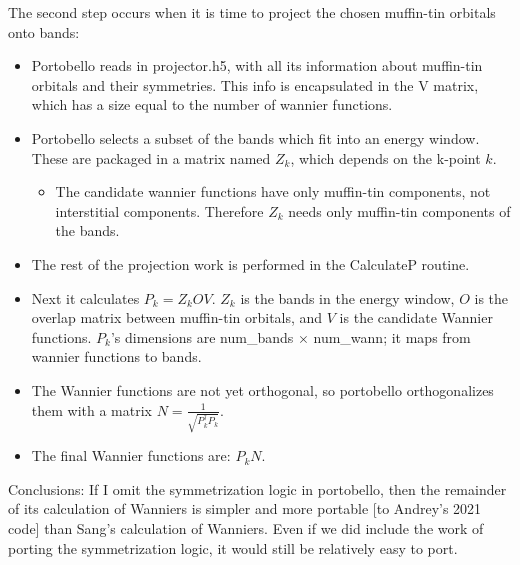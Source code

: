 \documentclass[aps,prb,singlecolumn,preprintnumbers,amsmath,amssymb]{revtex4}
\begin{document}
The second step occurs when it is time to project the chosen muffin-tin orbitals onto bands:
\begin{itemize}
\item Portobello reads in projector.h5, with all its information about muffin-tin orbitals and their symmetries. This info is encapsulated in the V matrix, which has a size equal to the number of wannier functions.
\item Portobello selects a subset of the bands which fit into an energy window.  These are packaged in a matrix named $Z_k$, which depends on the k-point $k$.
\begin{itemize}
\item The candidate wannier functions have only muffin-tin components, not interstitial components.  Therefore $Z_k$ needs only muffin-tin components of the bands.
\end{itemize}
\item The rest of the projection work  is performed in the CalculateP routine.
\item Next it calculates $P_k = Z_k O V$.  $Z_k$ is the bands in the energy window, $O$ is the overlap matrix between muffin-tin orbitals, and $V$ is the candidate Wannier functions.  $P_k$'s dimensions are num\_bands $\times$ num\_wann; it maps from wannier functions to bands.
\item The Wannier functions are not yet orthogonal, so portobello orthogonalizes them with a matrix $N = \frac{1}{\sqrt{P_k^\dagger P_k}}$.  
\item The final Wannier functions are: $P_k N$.  
\end{itemize}

Conclusions:   If I omit the symmetrization logic in portobello, then the remainder of its calculation of Wanniers is simpler and more portable [to Andrey's 2021 code] than Sang's calculation of Wanniers.     Even if we did include the work of porting the symmetrization logic, it would still be relatively easy to port.


\end{document}
